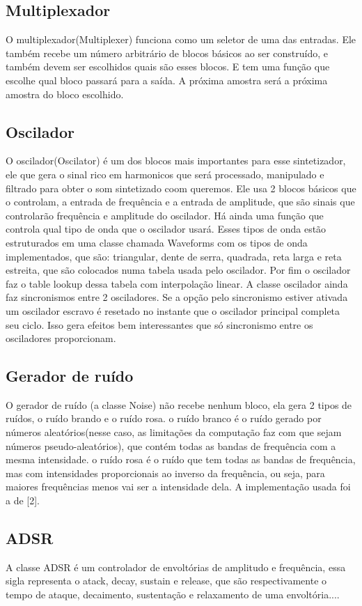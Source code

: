 \documentclass{article}
\begin{document}
\subsection{Multiplexador}
O multiplexador(Multiplexer) funciona como um seletor de uma das entradas. Ele também recebe um número arbitrário de blocos básicos ao ser construído, e também devem ser escolhidos quais são esses blocos. E tem uma função que escolhe qual bloco passará para a saída. A próxima amostra será a próxima amostra do bloco escolhido.
\subsection{Oscilador}
O oscilador(Oscilator) é um dos blocos mais importantes para esse sintetizador, ele que gera o sinal rico em harmonicos que será processado, manipulado e filtrado para obter o som sintetizado coom queremos.
Ele usa 2 blocos básicos que o controlam, a entrada de frequência e a entrada de amplitude, que são sinais que controlarão frequência e amplitude do oscilador. 
Há ainda uma função que controla qual tipo de onda que o oscilador usará. Esses tipos de onda estão estruturados em uma classe chamada Waveforms com os tipos de onda implementados, que são: triangular, dente de serra, quadrada, reta larga e reta estreita, que são colocados numa tabela usada pelo oscilador. Por fim o oscilador faz o table lookup dessa tabela  com interpolação linear.
A classe oscilador ainda faz sincronismos entre 2 osciladores. Se a opção pelo sincronismo estiver ativada um oscilador escravo é resetado no instante que o oscilador principal completa seu ciclo. Isso gera efeitos  bem interessantes que só sincronismo entre os osciladores proporcionam.

\subsection{Gerador de ruído}
O gerador de ruído (a classe Noise) não recebe nenhum bloco, ela gera 2 tipos de ruídos, o ruído brando e o ruído rosa.
o ruído branco é o ruído gerado por números aleatórios(nesse caso, as limitações da computação faz com que sejam números pseudo-aleatórios), que contém todas as bandas de frequência com a mesma intensidade.
o ruído rosa é o ruído que tem todas as bandas de frequência, mas com intensidades proporcionais ao inverso da frequência, ou seja, para maiores frequências menos vai ser a intensidade dela. A implementação usada foi a de [2].
\subsection{ADSR}
A classe ADSR é um controlador de envoltórias de amplitudo e frequência, essa sigla representa o atack, decay, sustain e release, que são respectivamente o tempo de ataque, decaimento, sustentação e relaxamento de uma envoltória....
\end{document}

